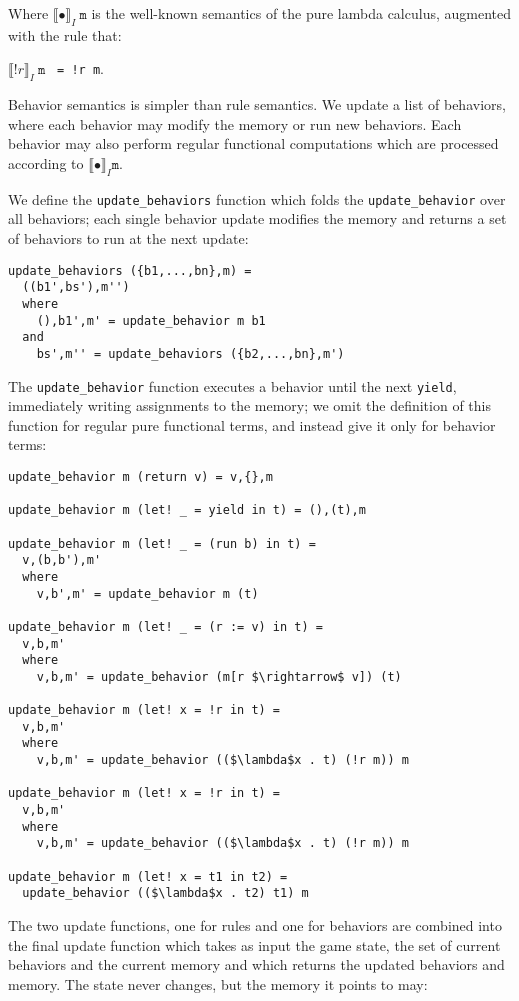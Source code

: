 Where $\llbracket \bullet \rrbracket_I\ \mathtt{m}$ is the well-known semantics of the pure lambda calculus, augmented with the rule that:

$\llbracket !r \rrbracket_I\ \mathtt{m}$ \texttt{ = !r m}.

Behavior semantics is simpler than rule semantics. We update a list of behaviors, where each behavior may modify the memory or run new behaviors. Each behavior may also perform regular functional computations which are processed according to $\llbracket \bullet \rrbracket_I \mathtt{m}$.

We define the \texttt{update\_behaviors} function which folds the \texttt{update\_behavior} over all behaviors; each single behavior update modifies the memory and returns a set of behaviors to run at the next update:

\begin{lstlisting}
update_behaviors ({b1,...,bn},m) =
  ((b1',bs'),m'')
  where 
    (),b1',m' = update_behavior m b1
  and
    bs',m'' = update_behaviors ({b2,...,bn},m')
\end{lstlisting}

The \texttt{update\_behavior} function executes a behavior until the next \texttt{yield}, immediately writing assignments to the memory; we omit the definition of this function for regular pure functional terms, and instead give it only for behavior terms:

\begin{lstlisting}
update_behavior m (return v) = v,{},m

update_behavior m (let! _ = yield in t) = (),(t),m

update_behavior m (let! _ = (run b) in t) = 
  v,(b,b'),m'
  where
    v,b',m' = update_behavior m (t)

update_behavior m (let! _ = (r := v) in t) = 
  v,b,m'
  where
    v,b,m' = update_behavior (m[r $\rightarrow$ v]) (t)

update_behavior m (let! x = !r in t) = 
  v,b,m'
  where
    v,b,m' = update_behavior (($\lambda$x . t) (!r m)) m

update_behavior m (let! x = !r in t) = 
  v,b,m'
  where
    v,b,m' = update_behavior (($\lambda$x . t) (!r m)) m

update_behavior m (let! x = t1 in t2) = 
  update_behavior (($\lambda$x . t2) t1) m
\end{lstlisting}

The two update functions, one for rules and one for behaviors are combined into the final update function which takes as input the game state, the set of current behaviors and the current memory and which returns the updated behaviors and memory. The state never changes, but the memory it points to may:

